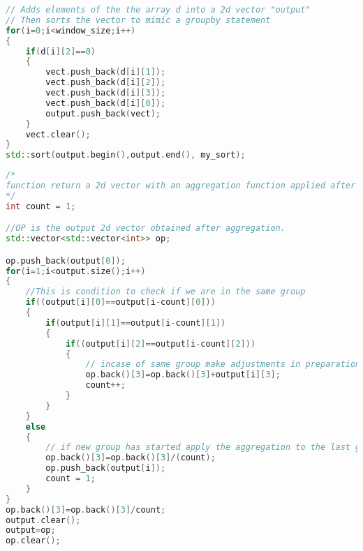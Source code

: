 \begin{lstlisting}[language=C++, caption= groupby statement for the simple query, label={lst:simple_query_groupby}]
// Adds elements of the the array d into a 2d vector "output"
// Then sorts the vector to mimic a groupby statement
for(i=0;i<window_size;i++)
{
    if(d[i][2]==0)
    {
        vect.push_back(d[i][1]);
        vect.push_back(d[i][2]);
        vect.push_back(d[i][3]);
        vect.push_back(d[i][0]);
        output.push_back(vect);
    }
    vect.clear();
}
std::sort(output.begin(),output.end(), my_sort);
\end{lstlisting}

\begin{lstlisting}[language=C++, caption= applying aggregation function for simple query
, label={lst:simple_query_aggregation}]
/*
function return a 2d vector with an aggregation function applied after a groupby function is used
*/
int count = 1;

//OP is the output 2d vector obtained after aggregation.
std::vector<std::vector<int>> op;

op.push_back(output[0]);
for(i=1;i<output.size();i++)
{
    //This is condition to check if we are in the same group
    if((output[i][0]==output[i-count][0]))
    {
        if(output[i][1]==output[i-count][1])
        {
            if((output[i][2]==output[i-count][2]))
            {    
                // incase of same group make adjustments in preparation for aggregation function
                op.back()[3]=op.back()[3]+output[i][3];
                count++;
            }
        }
    }
    else
    {
        // if new group has started apply the aggregation to the last group
        op.back()[3]=op.back()[3]/(count);
        op.push_back(output[i]);
        count = 1;
    }
}
op.back()[3]=op.back()[3]/count;
output.clear();
output=op;
op.clear();
\end{lstlisting}

